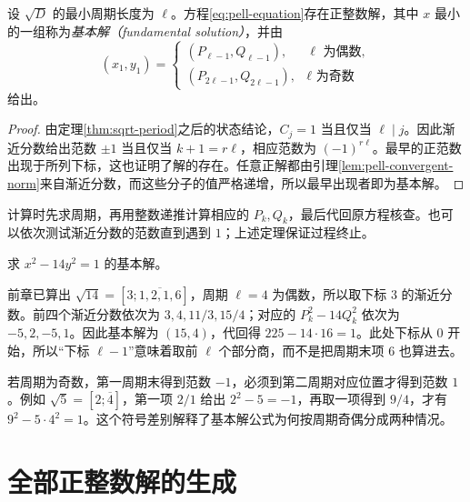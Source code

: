 \begin{theorem}[基本解的周期公式]
\label{thm:pell-fundamental}
设 $\sqrt D$ 的最小周期长度为 $\ell$。方程\eqref{eq:pell-equation}存在正整数解，其中 $x$ 最小的一组称为\emph{基本解（fundamental solution）}，并由
\[
 (x_1,y_1)=
 \begin{cases}
 (P_{\ell-1},Q_{\ell-1}),&\ell\text{ 为偶数},\\
 (P_{2\ell-1},Q_{2\ell-1}),&\ell\text{ 为奇数}
 \end{cases}
\]
给出。
\end{theorem}
\begin{proof}
由定理\ref{thm:sqrt-period}之后的状态结论，$C_j=1$ 当且仅当 $\ell\mid j$。因此渐近分数给出范数 $\pm1$ 当且仅当 $k+1=r\ell$，相应范数为 $(-1)^{r\ell}$。最早的正范数出现于所列下标，这也证明了解的存在。任意正解都由引理\ref{lem:pell-convergent-norm}来自渐近分数，而这些分子的值严格递增，所以最早出现者即为基本解。
\end{proof}

计算时先求周期，再用整数递推计算相应的 $P_k,Q_k$，最后代回原方程核查。也可以依次测试渐近分数的范数直到遇到 $1$；上述定理保证过程终止。

\begin{example}[从一个周期中读出基本解]
求 $x^2-14y^2=1$ 的基本解。
\end{example}
\begin{solve}
前章已算出 $\sqrt{14}=[3;\overline{1,2,1,6}]$，周期 $\ell=4$ 为偶数，所以取下标 $3$ 的渐近分数。前四个渐近分数依次为 $3,4,11/3,15/4$；对应的 $P_k^2-14Q_k^2$ 依次为 $-5,2,-5,1$。因此基本解为 $(15,4)$，代回得 $225-14\cdot16=1$。此处下标从 $0$ 开始，所以“下标 $\ell-1$”意味着取前 $\ell$ 个部分商，而不是把周期末项 $6$ 也算进去。
\end{solve}

若周期为奇数，第一周期末得到范数 $-1$，必须到第二周期对应位置才得到范数 $1$。例如 $\sqrt5=[2;\overline4]$，第一项 $2/1$ 给出 $2^2-5=-1$，再取一项得到 $9/4$，才有 $9^2-5\cdot4^2=1$。这个符号差别解释了基本解公式为何按周期奇偶分成两种情况。

\section{全部正整数解的生成}

